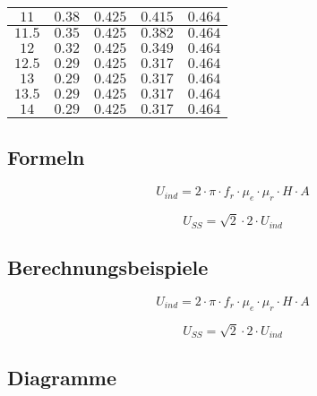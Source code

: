 \documentclass[12pt,a4paper,ngerman]{article}
\begin{document}
\begin{tabular}{ |c|c|c|c|c| }
      \hline
  $11$ & $0.38$ & $0.425$ & $0.415$ & $0.464$ \\
      \hline
  $11.5$ & $0.35$ & $0.425$ & $0.382$ & $0.464$ \\
      \hline
  $12$ & $0.32$ & $0.425$ & $0.349$ & $0.464$ \\
      \hline
  $12.5$ & $0.29$ & $0.425$ & $0.317$ & $0.464$ \\
      \hline
  $13$ & $0.29$ & $0.425$ & $0.317$ & $0.464$ \\
      \hline
  $13.5$ & $0.29$ & $0.425$ & $0.317$ & $0.464$ \\
        \hline
  $14$ & $0.29$ & $0.425$ & $0.317$ & $0.464$ \\
  \hline
 
\end{tabular}

\subsection{Formeln}

\begin{equation}
U_{ind} = 2 \cdot  \pi \cdot f_r \cdot \mu_e \cdot \mu_r \cdot H \cdot A
\end{equation}

\begin{equation}
U_{SS} = \sqrt{2}  \cdot 2 \cdot U_{ind}
\end{equation}
\pagebreak
\subsection{Berechnungsbeispiele}

\begin{equation}
U_{ind} = 2 \cdot  \pi \cdot f_r \cdot \mu_e \cdot \mu_r \cdot H \cdot A
\end{equation}

\begin{equation}
U_{SS} = \sqrt{2}  \cdot 2 \cdot U_{ind}
\end{equation}

\subsection{Diagramme}
\end{document}
